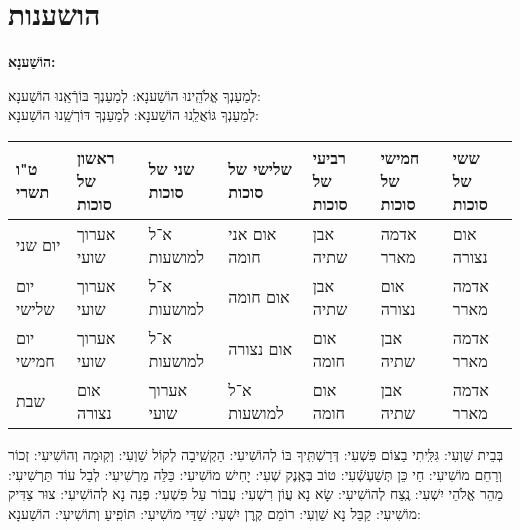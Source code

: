 \documentclass[twoside, openany, parskip=half, 11pt]{book}
\begin{document}
\pageref{musaphregel}


\chapter[הושענות]{ הושענות }
\label{hoshanos}


\begin{Large}
\textbf{
הוֹשַׁענָא:
}
 \end{Large}
 
  
 לְמַעַנְךָ אֱלֹהֵֽינוּ הוֹשַׁענָא: לְמַעַנְךָ בּוֹרְֿאֵֽנוּ הוֹשַׁענָא:\\
לְמַעַנְךָ גּוֹאֲלֵֽנוּ הוֹשַׁענָא: לְמַעַנְךָ דּוֹרְשֵֽׁנוּ הוֹשַׁענָא:

\begin{tiny}
\begin{tabular}{>{\centering\arraybackslash}m{}||>{\centering\arraybackslash}m{}|>{\centering\arraybackslash}m{}|>{\centering\arraybackslash}m{}|>{\centering\arraybackslash}m{}|>{\centering\arraybackslash}m{}|>{\centering\arraybackslash}m{}}
ט"ו תשרי & ראשון של סוכות & שני של סוכות & שלישי של סוכות & רביעי של סוכות & חמישי של סוכות & ששי של סוכות \\
\hline \hline
יום שני & אערוך שועי & א־ל למושעות & אום אני חומה & אבן שתיה & אדמה מארר & אום נצורה\\ \hline
יום שלישי & אערוך שועי & א־ל למושעות & אום חומה & אבן שתיה & אום נצורה & אדמה מארר \\ \hline
יום חמישי & אערוך שועי & א־ל למושעות & אום נצורה & אום חומה & אבן שתיה & אדמה מארר\\ \hline
שבת & אום נצורה & אערוך שועי & א־ל למושעות & אום חומה & אבן שתיה & אדמה מארר 
\end{tabular}

\end{tiny}


בְּבֵית שַׁוְעִי: גִּלִּֽיתִי בַצּוֹם פִּשְׁעִי: דְּרַשְׁתִּֽיךָ בּוֹ לְהוֹשִׁיעִי: הַקְשִֽׁיבָה לְקוֹל שַׁוְעִי: וְקֽוּמָה וְהוֹשִׁיעִי: זְכוֹר וְרַחֵם מוֹשִׁיעִי: חַי כֵּן תְּשַׁעְשְֿׁעִי: טוֹב בְּאֶֽנֶק שְׁעִי: יָחִישׁ מוֹשִׁיעִי: כַּלֵּה מַרְשִׁיעִי: לְבַל עוֹד תַּרְשִׁיעִי: מַהֵר אֱלֹהֵי יִשְׁעִי: נֶֽצַח לְהוֹשִׁיעִי: שָׂא נָא עֲוֹן רִשְׁעִי: עֲבוֹר עַל פִּשְׁעִי: פְּנֵה נָא לְהוֹשִׁיעִי: צוּר צַדִּיק מוֹשִׁיעִי: קַבֵּל נָא שַׁוְעִי: רוֹמֵם קֶֽרֶן יִשְׁעִי:
 שַׁדַּי מוֹשִׁיעִי: תּוֹפִֽיעַ וְתוֹשִׁיעִי: הוֹשַׁענָא:

\end{document}
